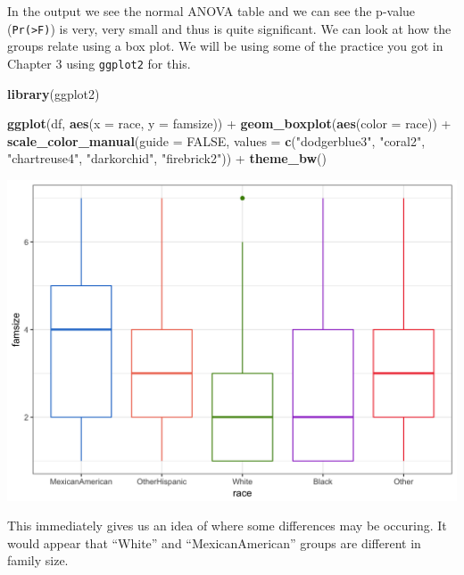\documentclass[]{tufte-book}
\newenvironment{Shaded}{}{}
\newcommand{\KeywordTok}[1]{\textcolor[rgb]{0.00,0.44,0.13}{\textbf{#1}}}
\newcommand{\DataTypeTok}[1]{\textcolor[rgb]{0.56,0.13,0.00}{#1}}
\newcommand{\StringTok}[1]{\textcolor[rgb]{0.25,0.44,0.63}{#1}}
\newcommand{\OtherTok}[1]{\textcolor[rgb]{0.00,0.44,0.13}{#1}}
\newcommand{\OperatorTok}[1]{\textcolor[rgb]{0.40,0.40,0.40}{#1}}
\newcommand{\NormalTok}[1]{#1}
\theoremstyle{definition}
\theoremstyle{definition}
\theoremstyle{remark}
\begin{document}
In the output we see the normal ANOVA table and we can see the p-value
(\texttt{Pr(\textgreater{}F)}) is very, very small and thus is quite
significant. We can look at how the groups relate using a box plot. We
will be using some of the practice you got in Chapter 3 using
\texttt{ggplot2} for this.

\begin{Shaded}
\begin{Highlighting}[]
\KeywordTok{library}\NormalTok{(ggplot2)}

\KeywordTok{ggplot}\NormalTok{(df, }\KeywordTok{aes}\NormalTok{(}\DataTypeTok{x =}\NormalTok{ race, }\DataTypeTok{y =}\NormalTok{ famsize)) }\OperatorTok{+}\StringTok{ }\KeywordTok{geom_boxplot}\NormalTok{(}\KeywordTok{aes}\NormalTok{(}\DataTypeTok{color =}\NormalTok{ race)) }\OperatorTok{+}\StringTok{ }
\StringTok{    }\KeywordTok{scale_color_manual}\NormalTok{(}\DataTypeTok{guide =} \OtherTok{FALSE}\NormalTok{, }\DataTypeTok{values =} \KeywordTok{c}\NormalTok{(}\StringTok{"dodgerblue3"}\NormalTok{, }
        \StringTok{"coral2"}\NormalTok{, }\StringTok{"chartreuse4"}\NormalTok{, }\StringTok{"darkorchid"}\NormalTok{, }
        \StringTok{"firebrick2"}\NormalTok{)) }\OperatorTok{+}\StringTok{ }\KeywordTok{theme_bw}\NormalTok{()}
\end{Highlighting}
\end{Shaded}

\includegraphics{_main_files/figure-latex/unnamed-chunk-64-1}

This immediately gives us an idea of where some differences may be
occuring. It would appear that ``White'' and ``MexicanAmerican'' groups
are different in family size.
\end{document}
